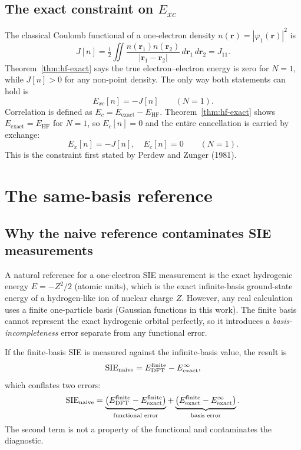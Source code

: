 \documentclass[11pt]{report}
\theoremstyle{definition}
\theoremstyle{remark}
\newcommand{\SIE}{\mathrm{SIE}}
\newcommand{\Exc}{E_{xc}}
\newcommand{\EHF}{E_{\mathrm{HF}}}
\newcommand{\Eexact}{E_{\mathrm{exact}}}
\begin{document}
\subsection{The exact constraint on $\Exc$}

The classical Coulomb functional of a one-electron density
$n(\mathbf r) = |\varphi_1(\mathbf r)|^2$ is
\begin{equation}
J[n] = \tfrac12 \iint \frac{n(\mathbf r_1) n(\mathbf r_2)}
                           {|\mathbf r_1 - \mathbf r_2|}
       \, d\mathbf r_1 \, d\mathbf r_2 = J_{11}.
\end{equation}
Theorem~\ref{thm:hf-exact} says the true electron--electron energy is zero
for $N=1$, while $J[n] > 0$ for any non-point density. The only way both
statements can hold is
\begin{equation}
\Exc[n] = -J[n] \qquad (N=1).
\end{equation}
Correlation is defined as $E_c = \Eexact - \EHF$. Theorem~\ref{thm:hf-exact}
shows $\Eexact = \EHF$ for $N=1$, so $E_c[n] = 0$ and the entire
cancellation is carried by exchange:
\begin{equation}
\boxed{\; E_x[n] = -J[n], \quad E_c[n] = 0 \qquad (N=1). \;}
\label{eq:sic-constraint}
\end{equation}
This is the constraint first stated by Perdew and Zunger (1981).

\section{The same-basis reference}

\subsection{Why the naive reference contaminates SIE measurements}

A natural reference for a one-electron SIE measurement is the exact
hydrogenic energy $E = -Z^2/2$ (atomic units), which is the exact
infinite-basis ground-state energy of a hydrogen-like ion of nuclear charge
$Z$. However, any real calculation uses a finite one-particle basis
(Gaussian functions in this work). The finite basis cannot represent the
exact hydrogenic orbital perfectly, so it introduces a
\emph{basis-incompleteness} error separate from any functional error.

If the finite-basis SIE is measured against the infinite-basis value,
the result is
\begin{equation}
\SIE_{\rm naive} = E_{\rm DFT}^{\rm finite} - E_{\rm exact}^{\infty},
\end{equation}
which conflates two errors:
\begin{equation}
\SIE_{\rm naive}
= \underbrace{\big( E_{\rm DFT}^{\rm finite} - E_{\rm exact}^{\rm finite} \big)}_{\text{functional error}}
+ \underbrace{\big( E_{\rm exact}^{\rm finite} - E_{\rm exact}^{\infty} \big)}_{\text{basis error}}.
\end{equation}
The second term is not a property of the functional and contaminates the
diagnostic.
\end{document}
